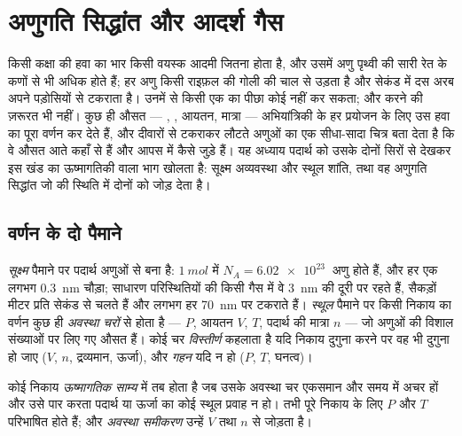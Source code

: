 \chapter{अणुगति सिद्धांत और आदर्श गैस}\label{ch:b1:kinetic-theory}

किसी कक्षा की हवा का भार किसी वयस्क आदमी जितना होता है, और उसमें अणु
पृथ्वी की सारी रेत के कणों से भी अधिक होते हैं; हर अणु किसी राइफ़ल की गोली
की चाल से उड़ता है और सेकंड में दस अरब  अपने पड़ोसियों से टकराता है।
उनमें से किसी एक का पीछा कोई नहीं कर सकता; और करने की ज़रूरत भी नहीं। कुछ
ही औसत --- , , आयतन, मात्रा --- अभियांत्रिकी के हर प्रयोजन के लिए उस
हवा का पूरा वर्णन कर देते हैं, और दीवारों से टकराकर लौटते अणुओं का एक
सीधा-सादा चित्र बता देता है कि वे औसत आते कहाँ से हैं और आपस में कैसे जुड़े
हैं। यह अध्याय पदार्थ को उसके दोनों सिरों से देखकर इस खंड का ऊष्मागतिकी
वाला भाग खोलता है: सूक्ष्म अव्यवस्था और स्थूल शांति, तथा वह अणुगति
सिद्धांत जो  की स्थिति में दोनों को जोड़ देता है।

\section{वर्णन के दो पैमाने}

\begin{definition}[सूक्ष्म और स्थूल पैमाने]\label{def:b1:kinetic-theory:scales}
\emph{सूक्ष्म} पैमाने पर पदार्थ अणुओं से बना है: $\qty{1}{mol}$ में
$N_A = \qty{6.02e23}{}$ अणु होते हैं, और हर एक लगभग \qty{0.3}{nm} चौड़ा;
साधारण परिस्थितियों की किसी गैस में वे \qty{3}{nm} की दूरी पर रहते हैं,
सैकड़ों मीटर प्रति सेकंड से चलते हैं और लगभग हर \qty{70}{nm} पर टकराते
हैं। \emph{स्थूल} पैमाने पर किसी निकाय का वर्णन कुछ ही
\emph{अवस्था चरों} से होता है ---  $P$, आयतन $V$,  $T$, पदार्थ की
मात्रा $n$ --- जो अणुओं की विशाल संख्याओं पर लिए गए औसत हैं। कोई चर
\emph{विस्तीर्ण} कहलाता है यदि निकाय दुगुना करने पर वह भी दुगुना हो जाए
($V$, $n$, द्रव्यमान, ऊर्जा), और \emph{गहन} यदि न हो
($P$, $T$, घनत्व)।
\end{definition}

\begin{definition}[ऊष्मागतिक साम्य]\label{def:b1:kinetic-theory:equilibrium}
कोई निकाय \emph{ऊष्मागतिक साम्य} में तब होता है जब उसके अवस्था चर एकसमान
और समय में अचर हों और उसे पार करता पदार्थ या ऊर्जा का कोई स्थूल प्रवाह न
हो। तभी पूरे निकाय के लिए $P$ और $T$ परिभाषित होते हैं; और
\emph{अवस्था समीकरण} उन्हें $V$ तथा $n$ से जोड़ता है।
\end{definition}

